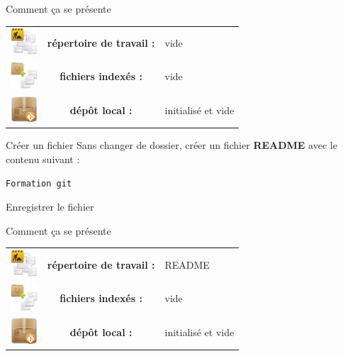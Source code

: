 \documentclass{beamer}
\begin{document}
\begin{frame}{Comment ça se présente}
\begin{center}
	\begin{tabular}{l c l}
	\includegraphics[width=1cm]{img/working_dir} & \textbf{répertoire de travail :} & vide \\
	\includegraphics[width=1cm]{img/stash} & \textbf{fichiers indexés :} & vide \\
	\includegraphics[width=1cm]{img/git_repo} & \textbf{dépôt local :} & initialisé et vide \\ 
	\end{tabular} 
\end{center}
\end{frame}

\begin{frame}[fragile]{Créer un fichier}
	Sans changer de dossier, créer un fichier \textbf{README} avec le contenu suivant :
	\begin{lstlisting}[frame=single]
		Formation git
	\end{lstlisting}
	Enregistrer le fichier
\end{frame}

\begin{frame}{Comment ça se présente}
\begin{center}
	\begin{tabular}{l c l}
	\includegraphics[width=1cm]{img/working_dir} & \textbf{répertoire de travail :} & README \\
	\includegraphics[width=1cm]{img/stash} & \textbf{fichiers indexés :} & vide \\
	\includegraphics[width=1cm]{img/git_repo} & \textbf{dépôt local :} & initialisé et vide \\ 
	\end{tabular} 
\end{center}
\end{frame}
\end{document}
